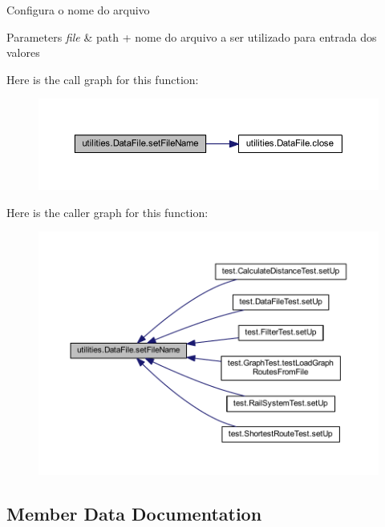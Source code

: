 Configura o nome do arquivo


\begin{DoxyParams}{Parameters}
{\em file} & path + nome do arquivo a ser utilizado para entrada dos valores \\
\hline
\end{DoxyParams}
Here is the call graph for this function\+:\nopagebreak
\begin{figure}[H]
\begin{center}
\leavevmode
\includegraphics[width=350pt]{classutilities_1_1_data_file_a03d4af9888db5dfd5031fd3ead4964bf_cgraph}
\end{center}
\end{figure}
Here is the caller graph for this function\+:\nopagebreak
\begin{figure}[H]
\begin{center}
\leavevmode
\includegraphics[width=350pt]{classutilities_1_1_data_file_a03d4af9888db5dfd5031fd3ead4964bf_icgraph}
\end{center}
\end{figure}


\subsection{Member Data Documentation}
\mbox{\label{classutilities_1_1_data_file_a7db48e719d69b2fb08dec6730949acf9}} 
